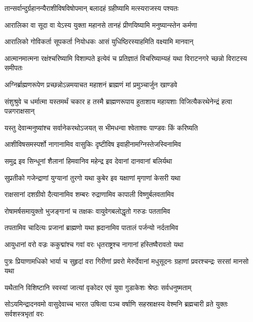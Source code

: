 \twolineshloka
{तान्सर्वान्दुर्ग्रहानन्यैराशीविषविषोपमान्}
{बलादहं ग्रहीष्यामि मत्स्यराजस्य पश्यतः}


\twolineshloka
{आरालिका वा सूदा वा येऽस्य युक्ता महानसे}
{तानहं प्रीणयिष्यामि मनुष्यान्स्तेन कर्मणा}


\twolineshloka
{आरालिको गोविकर्ता सूपकर्ता नियोधकः}
{आसं युधिष्ठिरस्याहमिति वक्ष्यामि मानवान्}


\threelineshloka
{आत्मानमात्मना रक्षंश्चरिष्यामि विशाम्पते}
{इत्येवं च प्रतिज्ञातं विचरिष्याम्यहं यथा}
{विराटनगरे च्छन्नो विराटस्य समीपतः}




\twolineshloka
{अग्निर्ब्राह्मणरूपेण प्रच्छन्नोऽन्नमयाचत}
{महाशनं ब्राह्मणं मां प्रमुञ्चार्जुन खाण्डवे}


\threelineshloka
{संशुश्रुवे च धर्मात्मा यस्तमर्थं चकार ह}
{तस्मै ब्राह्मणरूपाय हुताशाय महायशाः}
{विजित्यैकरथेनेन्द्रं हत्वा पन्नगराक्षसान्}


\twolineshloka
{यस्तु देवान्मनुष्यांश्च सर्वानेकरथोऽजयत्}
{स भीमधन्वा श्वेताश्वः पाण्डवः किं करिष्यति}


\twolineshloka
{आशीविषसमस्पर्शो नागानामिव वासुकिः}
{दृष्टीविष इवाहीनामग्निस्तेजस्विनामिव}


\twolineshloka
{समुद्र इव सिन्धूनां शैलानां हिमवानिव}
{महेन्द्र इव देवानां दानवानां बलिर्यथा}


\twolineshloka
{सुप्रतीको गजेन्द्राणां युग्यानां तुरगो यथा}
{कुबेर इव यक्षाणां मृगाणां केसरी यथा}


\twolineshloka
{राक्षसानां दशग्रीवो दैत्यानामिव शम्बरः}
{रुद्राणामिव कापाली विष्णुर्बलवतामिव}


\twolineshloka
{रोषामर्षसमायुक्तो भुजङ्गानां च तक्षकः}
{वायुवेगबलोद्धृतो गरुडः पततामिव}


\twolineshloka
{तपतामिव चादित्यः प्रजानां ब्राह्मणो यथा}
{ह्रदानामिव पातालं पर्जन्यो नर्दतामिव}


\twolineshloka
{आयुधानां वरो वज्रः ककुद्मांश्च गवां वरः}
{धृतराष्ट्रश्च नागानां हस्तिष्वैरावतो यथा}


\threelineshloka
{पुत्रः प्रियाणामधिको भार्या च सुहृदां वरा}
{गिरीणां प्रवरो मेरुर्देवानां मधुसूदनः}
{ग्रहाणां प्रवरश्चन्द्रः सरसां मानसो यथा}


\twolineshloka
{यथैतानि विशिष्टानि स्वस्यां जात्यां वृकोदर}
{एवं युवा गुडाकेशः श्रेष्ठः सर्वधनुष्मताम्}


\threelineshloka
{सोऽयमिन्द्रादनवमो वासुदेवाच्च भारत}
{उषित्वा पञ्च वर्षाणि सहस्राक्षस्य वेश्मनि}
{ब्रह्मचारी व्रते युक्तः सर्वशस्त्रभृतां वरः}


